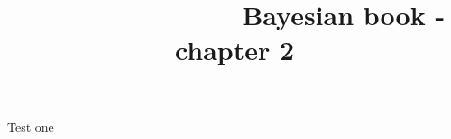 \documentclass[11pt,fullpage]{article}
\title{\textbf{~~~~~~~~~~~~~~~}\newline Bayesian book - chapter 2}
\author{}
\begin{document}
Test one
\end{document}
